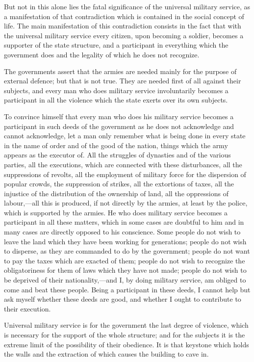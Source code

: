 \documentclass{book}
\begin{document}
But not in this alone lies the fatal significance of the universal military service, as a manifestation of that contradiction which is contained in the social concept of life. The main manifestation of this contradiction consists in the fact that with the universal military service every citizen, upon becoming a soldier, becomes a supporter of the state structure, and a participant in everything which the government does and the legality of which he does not recognize.

The governments assert that the armies are needed mainly for the purpose of external defence; but that is not true. They are needed first of all against their subjects, and every man who does military service involuntarily becomes a participant in all the violence which the state exerts over its own subjects.

To convince himself that every man who does his military service becomes a participant in such deeds of the government as he does not acknowledge and cannot acknowledge, let a man only remember what is being done in every state in the name of order and of the good of the nation, things which the army appears as the executor of. All the struggles of dynasties and of the various parties, all the executions, which are connected with these disturbances, all the suppressions of revolts, all the employment of military force for the dispersion of popular crowds, the suppression of strikes, all the extortions of taxes, all the injustice of the distribution of the ownership of land, all the oppressions of labour,—all this is produced, if not directly by the armies, at least by the police, which is supported by the armies. He who does military service becomes a participant in all these matters, which in some cases are doubtful to him and in many cases are directly opposed to his conscience. Some people do not wish to leave the land which they have been working for generations; people do not wish to disperse, as they are commanded to do by the government; people do not want to pay the taxes which are exacted of them; people do not wish to recognize the obligatoriness for them of laws which they have not made; people do not wish to be deprived of their nationality,—and I, by doing military service, am obliged to come and beat these people. Being a participant in these deeds, I cannot help but ask myself whether these deeds are good, and whether I ought to contribute to their execution.

Universal military service is for the government the last degree of violence, which is necessary for the support of the whole structure; and for the subjects it is the extreme limit of the possibility of their obedience. It is that keystone which holds the walls and the extraction of which causes the building to cave in.
\end{document}
